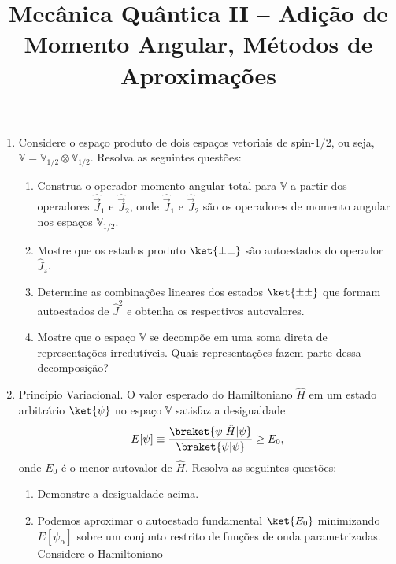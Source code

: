 \newif\ifuseseminar
\useseminartrue


\title{Mecânica Quântica II -- Adição de Momento Angular, Métodos de Aproximações}



\begin{enumerate}
      \item Considere o espaço produto de dois espaços vetoriais de spin-$1/2$, ou seja,
            $\mathbb{V} = \mathbb{V}_{1/2} \otimes \mathbb{V}_{1/2}$. Resolva as seguintes
            questões:
            \begin{enumerate}
                  \item Construa o operador momento angular total para $\mathbb{V}$ a partir
                        dos operadores $\hat{\vec{J}}_1$ e $\hat{\vec{J}}_2$, onde
                        $\hat{\vec{J}}_1$ e $\hat{\vec{J}}_2$ são os operadores de momento
                        angular nos espaços $\mathbb{V}_{1/2}$.
                  \item Mostre que os estados produto $\ket{\pm \pm}$ são autoestados do
                        operador $\hat{J}_z$.
                  \item Determine as combinações lineares dos estados $\ket{\pm \pm}$ que formam
                        autoestados de $\hat{J}^2$ e obtenha os respectivos autovalores.
                  \item Mostre que o espaço $\mathbb{V}$ se decompõe em uma soma direta de
                        representações irredutíveis. Quais representações fazem parte dessa
                        decomposição?
            \end{enumerate}
      \item Princípio Variacional. O valor esperado do Hamiltoniano $\hat{H}$ em um estado
            arbitrário $\ket{\psi}$ no espaço $\mathbb{V}$ satisfaz a desigualdade
            $$
                  E[\psi] \equiv \frac{\braket{\psi|\hat{H}|\psi}}{\braket{\psi|\psi}} \geq E_0,
            $$
            onde $E_0$ é o menor autovalor de $\hat{H}$. Resolva as seguintes questões:
            \begin{enumerate}
                  \item Demonstre a desigualdade acima.
                  \item Podemos aproximar o autoestado fundamental $\ket{E_0}$ minimizando
                        $E[\psi_\alpha]$ sobre um conjunto restrito de funções de onda
                        parametrizadas. Considere o Hamiltoniano

\end{enumerate}
\end{enumerate}
